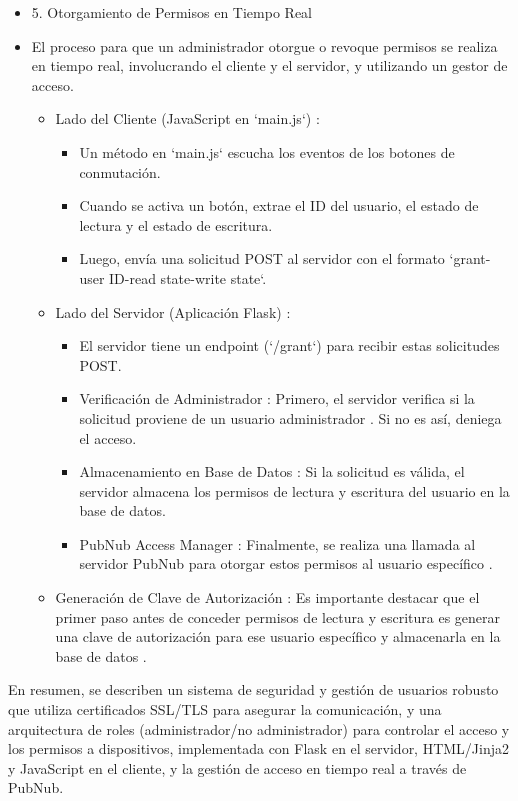 \documentclass{report}
\begin{document}
\begin{itemize}
    \item 5. Otorgamiento de Permisos en Tiempo Real
    \item El proceso para que un administrador otorgue o revoque permisos se realiza en tiempo real, involucrando el cliente y el servidor, y utilizando 
    un gestor de acceso.
    \begin{itemize}
        \item  Lado del Cliente (JavaScript en `main.js`) :
        \begin{itemize}
            \item Un método en `main.js` escucha los eventos de los botones de conmutación.
            \item Cuando se activa un botón, extrae el ID del usuario, el estado de lectura y el estado de escritura.
            \item Luego, envía una  solicitud POST  al servidor con el formato `grant-user ID-read state-write state`.
        \end{itemize}
        
        \item  Lado del Servidor (Aplicación Flask) :
        \begin{itemize}
            \item El servidor tiene un endpoint (`/grant`) para recibir estas solicitudes POST.
            \item Verificación de Administrador : Primero, el servidor  verifica si la solicitud proviene de un usuario administrador . Si no es así, 
            deniega el acceso.
            \item Almacenamiento en Base de Datos : Si la solicitud es válida, el servidor  almacena los permisos de lectura y escritura del usuario 
            en la base de datos.
            \item PubNub Access Manager : Finalmente, se realiza una llamada al  servidor PubNub para otorgar estos permisos al usuario específico .
        \end{itemize}

        \item  Generación de Clave de Autorización : Es importante destacar que el primer paso antes de conceder permisos de lectura y escritura 
        es  generar una clave de autorización para ese usuario específico y almacenarla en la base de datos .    
    \end{itemize}
\end{itemize}
En resumen, se  describen un sistema de seguridad y gestión de usuarios robusto que utiliza certificados SSL/TLS para asegurar la 
comunicación, y una arquitectura de roles (administrador/no administrador) para controlar el acceso y los permisos a dispositivos, 
implementada con Flask en el servidor, HTML/Jinja2 y JavaScript en el cliente, y la gestión de acceso en tiempo real a través de PubNub.
\end{document}
